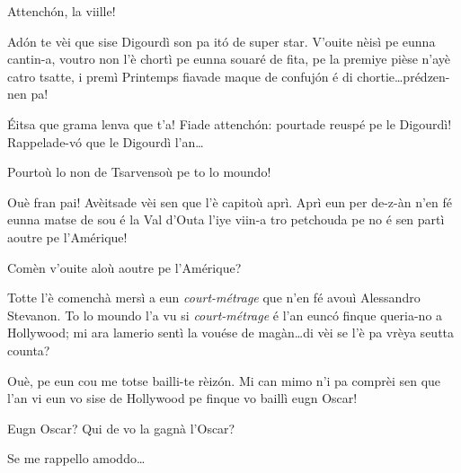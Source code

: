 \begin{drama}
\Joellespeaks{} Attench\'on, la viille!




\scene[-- Hollywood]

\Nevaouspeaks{} Ad\'on te vèi que sise Digourdì son pa it\'o de super star. V'ouite nèisì pe eunna cantin-a, voutro non l'è chortì pe eunna souaré de fita, pe la premiye pièse n'ayè catro tsatte, i premì Printemps fiavade  maque de confuj\'on é di chortie\ldots prédzen-nen pa!

\Paganspeaks \'Eitsa que grama lenva que t'a! Fiade attench\'on: pourtade reuspé pe le Digourdì! Rappelade-v\'o  que le Digourdì l'an\ldots

\Ledouspeaks Pourtoù lo non de Tsarvensoù pe to lo moun\-do!

\Paganspeaks Ouè fran pai!  Avèitsade vèi sen que l'è capitoù aprì. Aprì eun per de-z-àn n'en fé eunna matse de sou é la Val d’Outa l'iye viin-a tro petchouda pe no é sen partì aoutre pe l’Amérique!

\Nevaousaspeaks Comèn v'ouite aloù aoutre pe l’Amérique?

\Paganspeaks  Totte l'è comenchà mersì a eun \textit{court-métrage} que n'en fé avouì Alessandro Stevanon. To lo moundo l'a vu si \textit{court-mé\-tra\-ge} é l'an euncó finque queria-no a Hollywood; mi ara lamerio sentì la vouése de magàn\ldots di vèi se l'è pa vrèya seutta counta?

\Maganspeaks Ouè, pe eun cou me totse bailli-te rèiz\'on. Mi can mimo n'i pa comprèi sen que l'an vi eun vo sise de Hollywood pe finque vo baillì eugn Oscar!

\Nevaousaspeaks Eugn Oscar? Qui de vo la gagnà l’Oscar?

\Paganspeaks Se me rappello amoddo\ldots



\newpage
{}



\end{drama}
